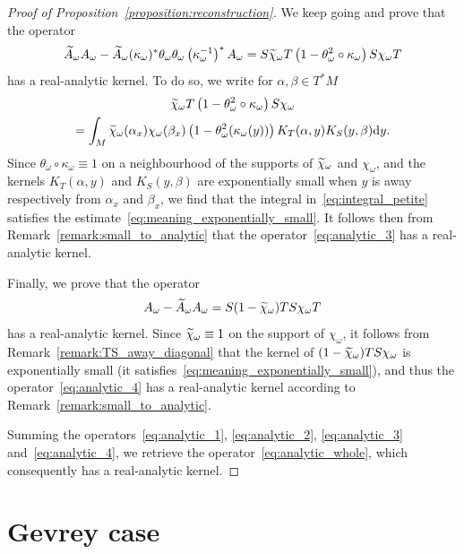 \documentclass[AHL,Unicode,longabstracts,published]{cedram}
\newcommand{\rmd}{\mathrm{d}}
\let\oldtilde\tilde
\renewcommand*{\tilde}[1]{\mathchoice{\widetilde{#1}}{\widetilde{#1}}{\oldtilde{#1}}{\oldtilde{#1}}}
\begin{document}
\begin{proof}[Proof of Proposition~\ref{proposition:reconstruction}]
We keep going and prove that the operator
\begin{equation}\label{eq:analytic_3}
\widetilde{A}_\omega A_\omega - \widetilde{A}_\omega (\kappa_\omega)^* \theta_\omega \theta_\omega \left(\kappa_\omega^{-1}\right)^* A_\omega = S \tilde{\chi}_\omega T \left(1 - \theta_\omega^2 \circ \kappa_\omega\right) S \chi_\omega T
\end{equation}
has a real-analytic kernel. To do so, we write for $\alpha,\beta \in T^* M$
\begin{multline}\label{eq:integral_petite}
\tilde{\chi}_\omega T \left(1 - \theta_\omega^2 \circ \kappa_\omega\right) S \chi_\omega\\
= \int_{M} \tilde{\chi}_\omega(\alpha_x) \chi_{\omega}(\beta_x) \left(1 - \theta_\omega^2 (\kappa_\omega(y))\right) K_T(\alpha,y) K_S(y,\beta) \rmd y.
\end{multline}
Since $\theta_\omega \circ \kappa_\omega \equiv 1$ on a neighbourhood of the supports of $\tilde{\chi}_\omega$ and $\chi_\omega$, and the kernels $K_T(\alpha,y)$ and $K_S(y,\beta)$ are exponentially small when $y$ is away respectively from $\alpha_x$ and $\beta_x$, we find that the integral in~\eqref{eq:integral_petite} satisfies the estimate~\eqref{eq:meaning_exponentially_small}. It follows then from Remark~\ref{remark:small_to_analytic} that the operator~\eqref{eq:analytic_3} has a real-analytic kernel.

Finally, we prove that the operator
\begin{equation}\label{eq:analytic_4}
A_\omega - \widetilde{A}_\omega A_\omega = S (1 - \tilde{\chi}_\omega)TS\chi_\omega T
\end{equation}
has a real-analytic kernel. Since $\tilde{\chi}_\omega \equiv 1$ on the support of $\chi_\omega$, it follows from Remark~\ref{remark:TS_away_diagonal} that the kernel of $(1 - \tilde{\chi}_\omega)TS\chi_\omega$ is exponentially small (it satisfies~\eqref{eq:meaning_exponentially_small}), and thus the operator~\eqref{eq:analytic_4} has a real-analytic kernel according to Remark~\ref{remark:small_to_analytic}.

Summing the operators~\eqref{eq:analytic_1}, \eqref{eq:analytic_2}, \eqref{eq:analytic_3} and~\eqref{eq:analytic_4}, we retrieve the operator~\eqref{eq:analytic_whole}, which consequently has a real-analytic kernel.
\end{proof}

\section{Gevrey case}\label{section:Gevrey}
\end{document}
